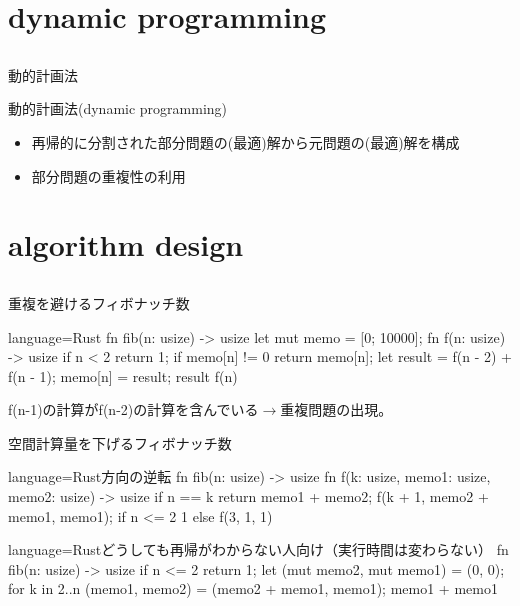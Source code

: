 \documentclass{beamer}
\subtitle{}
\begin{document}
\begin{frame}[fragile]{}
\titlepage
\end{frame}

\section{dynamic programming}		%
\subsection{}

\begin{frame}[fragile]{動的計画法}{}
\begin{block}{動的計画法(dynamic programming)}
\begin{itemize}%
\item 再帰的に分割された部分問題の(最適)解から元問題の(最適)解を構成
\item 部分問題の重複性の利用
\end{itemize}
\end{block}

\end{frame}

\section{algorithm design}		%
\subsection{}


\begin{frame}[fragile]{重複を避ける}{フィボナッチ数}
\begin{codeof}{language=Rust}{}
fn fib(n: usize) -> usize {
    let mut memo = [0; 10000];
    fn f(n: usize) -> usize {
        if n < 2 { return 1; }
        if memo[n] != 0 { return memo[n]; }
        let result = f(n - 2) + f(n - 1);
        memo[n] = result;
        result
    }
    f(n)
}
\end{codeof}
f(n-1)の計算がf(n-2)の計算を含んでいる$\to$重複問題の出現。

\end{frame}

\begin{frame}[fragile]{空間計算量を下げる}{フィボナッチ数}
\begin{codeof}{language=Rust}{方向の逆転}
fn fib(n: usize) -> usize {
    fn f(k: usize, memo1: usize, memo2: usize) -> usize{
        if n == k { return memo1 + memo2; } 
        f(k + 1, memo2 + memo1, memo1);
    }
    if n <= 2 { 1 } else { f(3, 1, 1) }
}
\end{codeof}

\begin{codeof}{language=Rust}{どうしても再帰がわからない人向け（実行時間は変わらない）}
fn fib(n: usize) -> usize {
    if n <= 2 { return 1; }
    let (mut memo2, mut memo1) = (0, 0);
    for k in 2..n {
        (memo1, memo2) = (memo2 + memo1, memo1);
    }
    memo1 + memo1
}
\end{codeof}
\end{frame}
\end{document}
